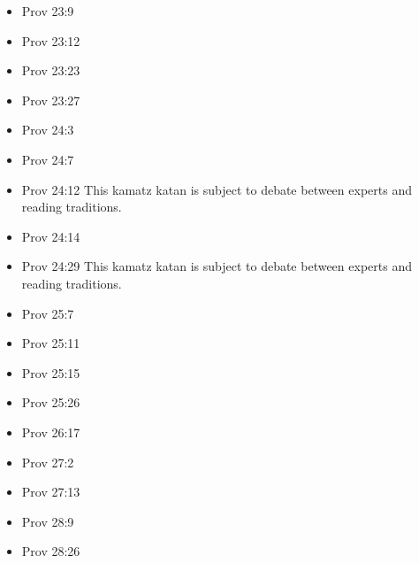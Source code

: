 \documentclass[14pt]{book}
\begin{document}
\begin{multicols}{2}
\begin{itemize}
									\item Prov 23:9
									
									\item Prov 23:12
									
									\item Prov 23:23
									
									\item Prov 23:27
									
									\item Prov 24:3
									
									\item Prov 24:7
									
									\item Prov 24:12 This kamatz katan is subject to debate between experts and reading traditions.
									
									\item Prov 24:14
									
									\item Prov 24:29 This kamatz katan is subject to debate between experts and reading traditions.
									
									\item Prov 25:7
									
									\item Prov 25:11
									
									\item Prov 25:15
									
									\item Prov 25:26
									
									\item Prov 26:17
									
									\item Prov 27:2
									
									\item Prov 27:13
									
									\item Prov 28:9
									
									\item Prov 28:26
									

\end{itemize}
\end{multicols}
\end{document}
